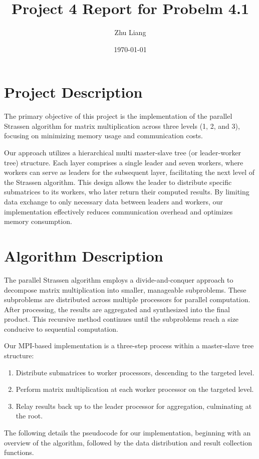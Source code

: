 \documentclass[12pt,a4paper]{article}
\title{Project 4 Report for Probelm 4.1}
\author{Zhu Liang}
\date{\today}
\begin{document}
\maketitle

\section{Project Description}
The primary objective of this project is the implementation of the parallel Strassen algorithm for matrix multiplication across three levels (1, 2, and 3), focusing on minimizing memory usage and communication costs.

Our approach utilizes a hierarchical multi master-slave tree (or leader-worker tree) structure. 
Each layer comprises a single leader and seven workers, where workers can serve as leaders for the subsequent layer, 
 facilitating the next level of the Strassen algorithm. 
This design allows the leader to distribute specific submatrices to its workers, 
 who later return their computed results. 
By limiting data exchange to only necessary data between leaders and workers, 
 our implementation effectively reduces communication overhead and optimizes memory consumption.


\section{Algorithm Description}
The parallel Strassen algorithm employs a divide-and-conquer approach to decompose matrix multiplication into smaller, manageable subproblems. 
These subproblems are distributed across multiple processors for parallel computation. After processing, the results are aggregated and synthesized into the final product. This recursive method continues until the subproblems reach a size conducive to sequential computation.
 
Our MPI-based implementation is a three-step process within a master-slave tree structure:
\begin{enumerate}
\item Distribute submatrices to worker processors, descending to the targeted level.
\item Perform matrix multiplication at each worker processor on the targeted level.
\item Relay results back up to the leader processor for aggregation, culminating at the root.
\end{enumerate}
 
The following details the pseudocode for our implementation, 
beginning with an overview of the algorithm, followed by the data distribution and result collection functions.
\end{document}
